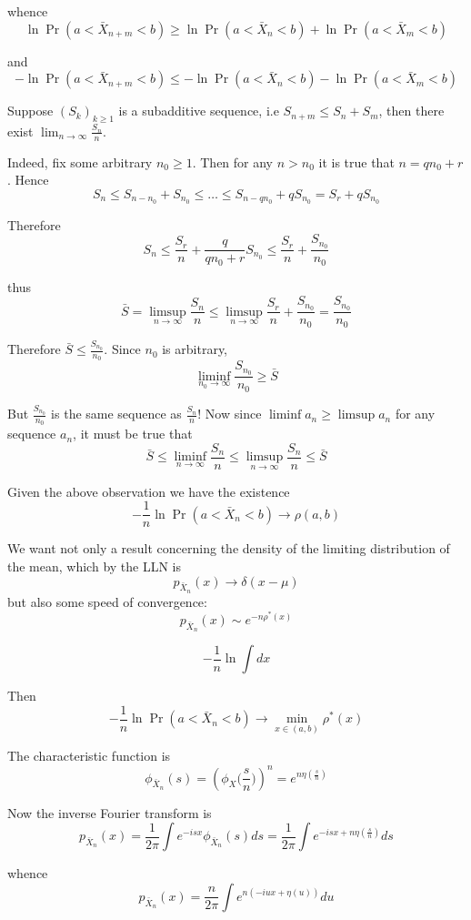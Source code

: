 \documentclass[a4paper]{article}
\newcommand{\brac}[1]{{\left ( #1 \right )}}
\begin{document}
whence 
\[\ln \Pr\brac{a<\bar{X}_{n+m}<b} \geq \ln \Pr\brac{a<\bar{X}_n<b} + \ln\Pr\brac{a<\bar{X}_m<b} \]

and
\[-\ln \Pr\brac{a<\bar{X}_{n+m}<b} \leq -\ln \Pr\brac{a<\bar{X}_n<b}  - \ln\Pr\brac{a<\bar{X}_m<b} \]

Suppose $\brac{S_k}_{k\geq1}$ is a subadditive sequence, i.e $S_{n+m}\leq S_n + S_m$, then there exist $\lim_{n\to \infty} \frac{S_n}{n}$.

Indeed, fix some arbitrary $n_0\geq1$. Then for any $n > n_0$ it is true that $n = q n_0 + r$.  Hence 
\[S_n \leq S_{n-n_0} + S_{n_0}\leq \ldots \leq S_{n-q n_0} + q S_{n_0} = S_r + q S_{n_0}\]

Therefore 
\[S_n \leq \frac{S_r}{n} + \frac{q}{q n_0 + r}S_{n_0}\leq \frac{S_r}{n} + \frac{S_{n_0}}{n_0}\]

thus
\[\bar{S} = \limsup_{n\to \infty} \frac{S_n}{n} \leq \limsup_{n\to \infty} \frac{S_r}{n} + \frac{S_{n_0}}{n_0} = \frac{S_{n_0}}{n_0}\]

Therefore $\bar{S}\leq \frac{S_{n_0}}{n_0}$. Since $n_0$ is arbitrary, 
\[\liminf_{n_0\to\infty} \frac{S_{n_0}}{n_0} \geq \bar{S}\]

But $\frac{S_{n_0}}{n_0}$ is the same sequence as $\frac{S_n}{n}$! Now since $\liminf a_n \geq \limsup a_n$ for any sequence $a_n$, it must be true that
\[\bar{S}\leq \liminf_{n\to\infty} \frac{S_n}{n} \leq \limsup_{n\to\infty} \frac{S_n}{n} \leq \bar{S}\]

Given the above observation we have the existence
\[-\frac{1}{n}\ln \Pr\brac{a<\bar{X}_n<b} \to \rho(a,b)\]

We want not only a result concerning the density of the limiting distribution of the mean, which by the LLN is \[p_{\bar{X}_n}(x)\to \delta(x-\mu)\]
but also some speed of convergence:
\[p_{\bar{X}_n}(x)\sim e^{-n \rho^*(x)}\]

\[ -\frac{1}{n} \ln \int dx \]

Then 
\[-\frac{1}{n}\ln \Pr\brac{a<\bar{X}_n<b} \to \min_{x\in (a,b)} \rho^*(x)\]

The characteristic function is
\[\phi_{\bar{X}_n}(s) = \brac{\phi_X\big(\frac{s}{n}\big)}^n = e^{n\eta(\frac{s}{n})}\]

Now the inverse Fourier transform is 
\[p_{\bar{X}_n}(x) = \frac{1}{2\pi}\int e^{-isx } \phi_{\bar{X}_n}(s) ds = \frac{1}{2\pi}\int e^{-isx + n \eta(\frac{s}{n})} ds\]

whence
\[p_{\bar{X}_n}(x) = \frac{n}{2\pi}\int e^{n\brac{-iux + \eta(u)}} du\]
\end{document}
